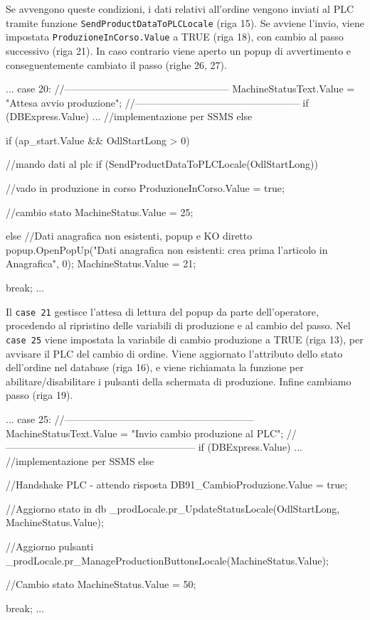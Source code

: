 Se avvengono queste condizioni, i dati relativi all'ordine vengono inviati al PLC tramite funzione \verb|SendProductDataToPLCLocale| (riga 15). Se avviene l'invio, viene impostata \verb|ProduzioneInCorso.Value| a TRUE (riga 18), con  cambio al passo successivo (riga 21). In caso contrario viene aperto un popup di avvertimento e conseguentemente cambiato il passo (righe 26, 27).
\begin{csharp}
...
    case 20:
    //--------------------------------------------------
    MachineStatusText.Value = "Attesa avvio produzione";
    //--------------------------------------------------
    if (DBExpress.Value)
    {
        ... //implementazione per SSMS
    }
    else
    {
        if (ap_start.Value && OdlStartLong > 0)
        {
            //mando dati al plc
            if (SendProductDataToPLCLocale(OdlStartLong))
            {
                //vado in produzione in corso
                ProduzioneInCorso.Value = true;

                //cambio stato
                MachineStatus.Value = 25;
            }
            else
            {
                //Dati anagrafica non esistenti, popup e KO diretto
                popup.OpenPopUp("Dati anagrafica non esistenti: crea prima l'articolo in Anagrafica", 0);
                MachineStatus.Value = 21;
            }
        }
    }
    
    break;
...
\end{csharp}
Il \verb|case 21| gestisce l'attesa di lettura del popup da parte dell'operatore, procedendo al ripristino delle variabili di produzione e al cambio del passo. Nel \verb|case 25| viene impostata la variabile di cambio produzione a TRUE (riga 13), per avvisare il PLC del cambio di ordine. Viene aggiornato l'attributo dello stato dell'ordine nel database (riga 16), e viene richiamata la funzione per abilitare/disabilitare i pulsanti della schermata di produzione. Infine cambiamo passo (riga 19).
\begin{csharp}
...
    case 25:
    //---------------------------------------------------------
    MachineStatusText.Value = "Invio cambio produzione al PLC";
    //---------------------------------------------------------
    if (DBExpress.Value)
    {
        ... //implementazione per SSMS
    }
    else
    {
        //Handshake PLC - attendo risposta
        DB91_CambioProduzione.Value = true;

        //Aggiorno stato in db
        _prodLocale.pr_UpdateStatusLocale(OdlStartLong, MachineStatus.Value);

        //Aggiorno pulsanti
        _prodLocale.pr_ManageProductionButtonsLocale(MachineStatus.Value);

        //Cambio stato
        MachineStatus.Value = 50;
    }

    break;
...
\end{csharp}
